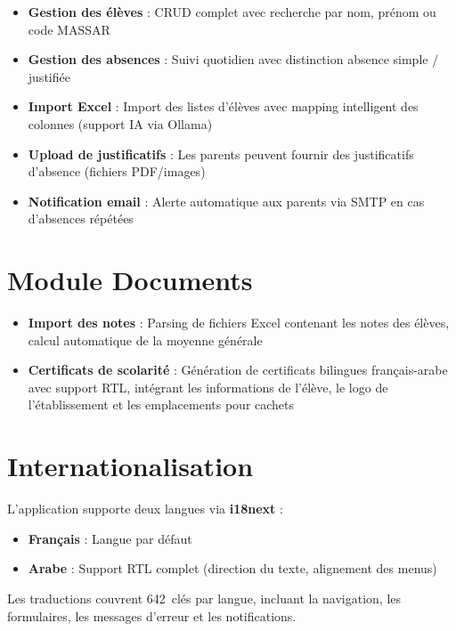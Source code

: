 \documentclass[12pt,a4paper]{report}
\begin{document}
\begin{itemize}
    \item \textbf{Gestion des élèves} : CRUD complet avec recherche par nom, prénom ou code MASSAR
    \item \textbf{Gestion des absences} : Suivi quotidien avec distinction absence simple / justifiée
    \item \textbf{Import Excel} : Import des listes d'élèves avec mapping intelligent des colonnes (support IA via Ollama)
    \item \textbf{Upload de justificatifs} : Les parents peuvent fournir des justificatifs d'absence (fichiers PDF/images)
    \item \textbf{Notification email} : Alerte automatique aux parents via SMTP en cas d'absences répétées
\end{itemize}

\section{Module Documents}

\begin{itemize}
    \item \textbf{Import des notes} : Parsing de fichiers Excel contenant les notes des élèves, calcul automatique de la moyenne générale
    \item \textbf{Certificats de scolarité} : Génération de certificats bilingues français-arabe avec support RTL, intégrant les informations de l'élève, le logo de l'établissement et les emplacements pour cachets
\end{itemize}

\section{Internationalisation}

L'application supporte deux langues via \textbf{i18next} :

\begin{itemize}
    \item \textbf{Français} : Langue par défaut
    \item \textbf{Arabe} : Support RTL complet (direction du texte, alignement des menus)
\end{itemize}

Les traductions couvrent 642~clés par langue, incluant la navigation, les formulaires, les messages d'erreur et les notifications.

\end{document}
